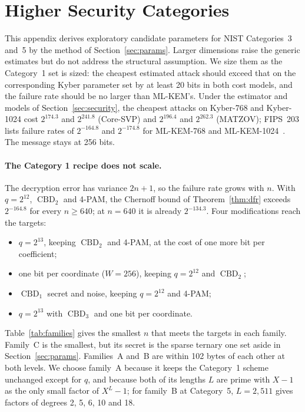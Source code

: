 \documentclass[11pt,a4paper]{article}
\theoremstyle{definition}
\newcommand{\CBD}{\operatorname{CBD}}
\begin{document}
\section{Higher Security Categories}\label{app:higher}
This appendix derives exploratory candidate parameters for NIST Categories~3 and~5 by the method of Section~\ref{sec:params}. Larger dimensions raise the generic estimates but do not address the structural assumption. We size them as the Category~1 set is sized: the cheapest estimated attack should exceed that on the corresponding Kyber parameter set by at least 20 bits in both cost models, and the failure rate should be no larger than ML-KEM's. Under the estimator and models of Section~\ref{sec:security}, the cheapest attacks on Kyber-768 and Kyber-1024 cost $2^{174.3}$ and $2^{241.8}$ (Core-SVP) and $2^{196.4}$ and $2^{262.3}$ (MATZOV); FIPS~203 lists failure rates of $2^{-164.8}$ and $2^{-174.8}$ for ML-KEM-768 and ML-KEM-1024~\cite[Table~1]{fips203}. The message stays at 256 bits.

\paragraph{The Category 1 recipe does not scale.} The decryption error has variance $2n + 1$, so the failure rate grows with $n$. With $q = 2^{12}$, $\CBD_2$ and 4-PAM, the Chernoff bound of Theorem~\ref{thm:dfr} exceeds $2^{-164.8}$ for every $n \ge 640$; at $n = 640$ it is already $2^{-134.3}$. Four modifications reach the targets:
\begin{itemize}
  \item[A.] $q = 2^{13}$, keeping $\CBD_2$ and 4-PAM, at the cost of one more bit per coefficient;
  \item[B.] one bit per coordinate ($W = 256$), keeping $q = 2^{12}$ and $\CBD_2$;
  \item[C.] $\CBD_1$ secret and noise, keeping $q = 2^{12}$ and 4-PAM;
  \item[D.] $q = 2^{13}$ with $\CBD_3$ and one bit per coordinate.
\end{itemize}
Table~\ref{tab:families} gives the smallest $n$ that meets the targets in each family. Family~C is the smallest, but its secret is the sparse ternary one set aside in Section~\ref{sec:params}. Families~A and~B are within 102 bytes of each other at both levels. We choose family~A because it keeps the Category~1 scheme unchanged except for $q$, and because both of its lengths $L$ are prime with $X - 1$ as the only small factor of $X^L - 1$; for family~B at Category~5, $L = 2{,}511$ gives factors of degrees 2, 5, 6, 10 and 18.
\end{document}
